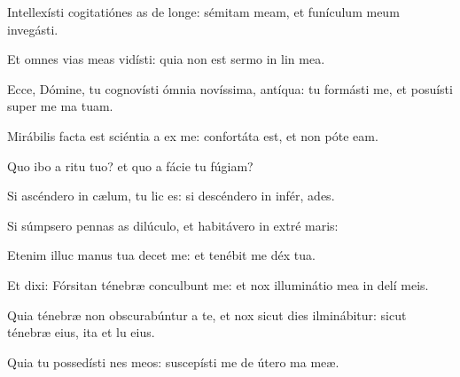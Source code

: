 \item {}

\item Intellexísti cogitatiónes as de longe:\psstar{} sémitam meam, et funículum meum invegásti.

\item Et omnes vias meas vidísti:\psstar{} quia non est sermo in lin mea.

\item Ecce, Dómine, tu cognovísti ómnia novíssima,  antíqua:\psstar{} tu formásti me, et posuísti super me ma tuam.

\item Mirábilis facta est sciéntia a ex me:\psstar{} confortáta est, et non póte  eam.

\item Quo ibo a ritu tuo?\psstar{} et quo a fácie tu fúgiam?

\item Si ascéndero in cælum, tu lic es:\psstar{} si descéndero in infér, ades.

\item Si súmpsero pennas as dilúculo,\psstar{} et habitávero in extré maris:

\item Etenim illuc manus tua decet me:\psstar{} et tenébit me déx tua.

\item Et dixi: Fórsitan ténebræ conculbunt me:\psstar{} et nox illuminátio mea in delí meis.

\item Quia ténebræ non obscurabúntur a te, et nox sicut dies ilminábitur:\psstar{} sicut ténebræ eius, ita et lu eius.

\item Quia tu possedísti nes meos:\psstar{} suscepísti me de útero ma meæ.
